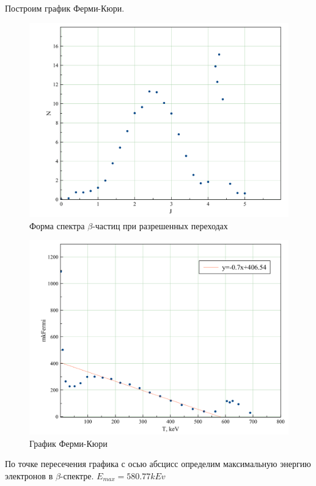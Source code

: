 \documentclass[a4paper,12pt]{article}
\begin{document}
\newpage

Построим график Ферми-Кюри.
\begin{figure}[h]
	\centering
	\includegraphics[width=\linewidth]{1.png}
	\caption{Форма спектра $\beta$-частиц при разрешенных переходах}
\end{figure}

\begin{figure}[h]
			\centering
			\includegraphics[width=\linewidth]{2.png}
			\caption{График Ферми-Кюри}
		\end{figure}
		
		
По точке пересечения графика с осью абсцисс определим максимальную энергию электронов в $\beta$-спектре. 
$E_{max} = 580.77 kEv$
\end{document}
